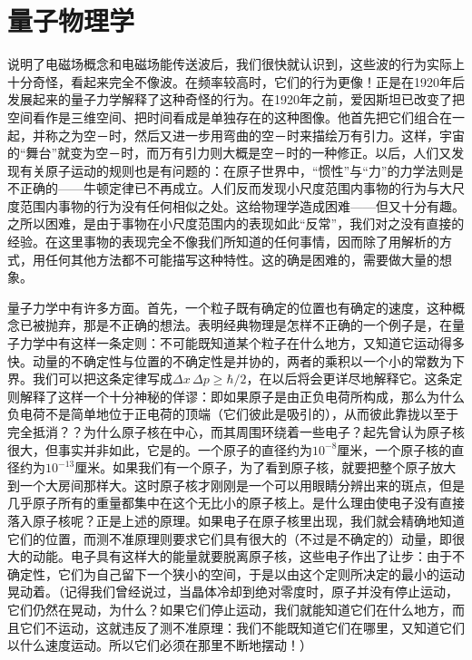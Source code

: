 \section{量子物理学}

说明了电磁场概念和电磁场能传送波后，我们很快就认识到，这些波的行为实际上十分奇怪，看起来完全不像波。在频率较高时，它们的行为更像！正是在1920年后发展起来的量子力学解释了这种奇怪的行为。在1920年之前，爱因斯坦已改变了把空间看作是三维空间、把时间看成是单独存在的这种图像。他首先把它们组合在一起，并称之为空－时，然后又进一步用弯曲的空－时来描绘万有引力。这样，宇宙的“舞台”就变为空－时，而万有引力则大概是空－时的一种修正。以后，人们又发现有关原子运动的规则也是有问题的：在原子世界中，“惯性”与“力”的力学法则是不正确的——牛顿定律已不再成立。人们反而发现小尺度范围内事物的行为与大尺度范围内事物的行为没有任何相似之处。这给物理学造成困难——但又十分有趣。之所以困难，是由于事物在小尺度范围内的表现如此“反常”，我们对之没有直接的经验。在这里事物的表现完全不像我们所知道的任何事情，因而除了用解析的方式，用任何其他方法都不可能描写这种特性。这的确是困难的，需要做大量的想象。

量子力学中有许多方面。首先，一个粒子既有确定的位置也有确定的速度，这种概念已被抛弃，那是不正确的想法。表明经典物理是怎样不正确的一个例子是，在量子力学中有这样一条定则：不可能既知道某个粒子在什么地方，又知道它运动得多快。动量的不确定性与位置的不确定性是并协的，两者的乘积以一个小的常数为下界。我们可以把这条定律写成$\Delta x\,\Delta p\geq\hbar/2$，在以后将会更详尽地解释它。这条定则解释了这样一个十分神秘的佯谬：即如果原子是由正负电荷所构成，那么为什么负电荷不是简单地位于正电荷的顶端（它们彼此是吸引的），从而彼此靠拢以至于完全抵消？？为什么原子核在中心，而其周围环绕着一些电子？起先曾认为原子核很大，但事实并非如此，它是的。一个原子的直径约为$10^{-8}$厘米，一个原子核的直径约为$10^{-13}$厘米。如果我们有一个原子，为了看到原子核，就要把整个原子放大到一个大房间那样大。这时原子核才刚刚是一个可以用眼睛分辨出来的斑点，但是几乎原子所有的重量都集中在这个无比小的原子核上。是什么理由使电子没有直接落入原子核呢？正是上述的原理。如果电子在原子核里出现，我们就会精确地知道它们的位置，而测不准原理则要求它们具有很大的（不过是不确定的）动量，即很大的动能。电子具有这样大的能量就要脱离原子核，这些电子作出了让步：由于不确定性，它们为自己留下一个狭小的空间，于是以由这个定则所决定的最小的运动晃动着。（记得我们曾经说过，当晶体冷却到绝对零度时，原子并没有停止运动，它们仍然在晃动，为什么？如果它们停止运动，我们就能知道它们在什么地方，而且它们不运动，这就违反了测不准原理：我们不能既知道它们在哪里，又知道它们以什么速度运动。所以它们必须在那里不断地摆动！）

